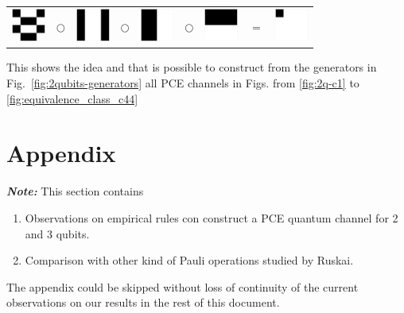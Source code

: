\documentclass[11pt,dvipsnames]{article} %
\newcommand{\Fref}[1]{Fig.~\ref{#1}}
\newcommand{\1}{\mathds{1}}
\begin{document}
\begin{itemize}
\hfill
\begin{tabular}{m{0.8cm} m{.1cm} m{0.8cm} m{.1cm} m{0.8cm} m{.1cm} m{0.8cm} m{.1cm} m{0.8cm}}
\includegraphics[height=1.1cm]{E12}
& $\bigcirc$ 
& \includegraphics[height=1.1cm]{E4}
& $\bigcirc$ 
& \includegraphics[height=1.1cm]{E2}  
& $\bigcirc$ 
& \includegraphics[height=1.1cm]{E5} 
& $=$
& \includegraphics[height=1.1cm]{E12E4E2E5} 
\end{tabular} \hspace{1.3cm}

This shows the idea and that is possible to construct from the generators
in \Fref{fig:2qubits-generators} 
all PCE channels in Figs. from \ref{fig:2q-c1} to \ref{fig:equivalence_class_c44}
\end{itemize}

\section*{Appendix}
\textit{\textbf{Note:}} This section contains
\begin{enumerate}
\item Observations on empirical rules con construct a PCE quantum channel
for 2 and 3 qubits.
\item Comparison with other kind of Pauli operations studied by Ruskai.
\end{enumerate}
The appendix could be skipped without loss of continuity of 
the current observations on our results in the rest of this document.
\end{document}
